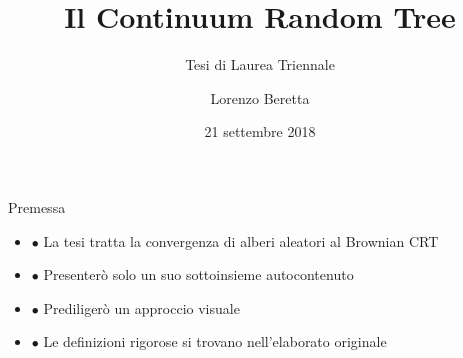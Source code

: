 \documentclass{beamer}
\title{Il Continuum Random Tree}
\subtitle{Tesi di Laurea Triennale}
\author{Lorenzo Beretta}
\date{21 settembre 2018}
\theoremstyle{definition}
\theoremstyle{plain}
\theoremstyle{remark}
\begin{document}
\begin{frame}
\maketitle
\end{frame}

\begin{frame}{Premessa}
\begin{itemize}
\item $\bullet$ La tesi tratta la convergenza di alberi aleatori al Brownian CRT
\bigskip
\item $\bullet$ Presenter\`o solo un suo sottoinsieme autocontenuto
\bigskip
\item $\bullet$ Prediliger\`o un approccio visuale
\bigskip
\item $\bullet$ Le definizioni rigorose si trovano nell'elaborato originale

\end{itemize}
\end{frame}
\end{document}
